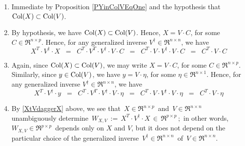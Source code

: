 \begin{theorem}
\begin{enumerate}
\end{enumerate}
\end{theorem}
\proof
\begin{enumerate}
\item
	Immediate by Proposition \ref{PYinColVEqOne} and the hypothesis that $\textnormal{Col}(X) \subset \textnormal{Col}(V)$.
\item
	By hypothesis, we have $\textnormal{Col}(X) \subset \textnormal{Col}(V)$.
	Hence, $X = V \cdot C$, for some $C \in \Re^{n \times p}$.
	Hence, for any generalized inverse $V^{\dagger} \in \Re^{n \times n}$,
	we have
	\begin{equation*}
	X^{T} \cdot V^{\dagger} \cdot X
	\;\; = \;\;
		C^{T} \cdot V^{T} \cdot V^{\dagger} \cdot V \cdot C
	\;\; = \;\;
		C^{T} \cdot V \cdot V^{\dagger} \cdot V \cdot C
	\;\; = \;\;
		C^{T} \cdot V \cdot C
	\end{equation*}
\item
	Again, since $\textnormal{Col}(X) \subset \textnormal{Col}(V)$, we may write
	$X = V \cdot C$, for some $C \in \Re^{n \times p}$.
	Similarly, since $y \in \textnormal{Col}(V)$, we have $y = V \cdot \eta$,
	for some $\eta \in \Re^{n \times 1}$.
	Hence, for any generalized inverse $V^{\dagger} \in \Re^{n \times n}$,
	we have
	\begin{equation*}
	X^{T} \cdot V^{\dagger} \cdot y
	\;\; = \;\;
		C^{T} \cdot V^{T} \cdot V^{\dagger} \cdot V \cdot \eta
	\;\; = \;\;
		C^{T} \cdot V \cdot V^{\dagger} \cdot V \cdot  \eta
	\;\; = \;\;
		C^{T} \cdot V \cdot \eta
	\end{equation*}
\item
	By \eqref{XtVdaggerX} above, we see that
	\,$X \in \Re^{n \times p}$\, and \,$V \in \Re^{n \times n}$\,
	unambiguously determine
	\,$W_{X,V} \, := \, X^{T} \cdot V^{\dagger} \cdot X \, \in \, \Re^{p \times p}$\,;\,
	in other words, \,$W_{X,V} \in \Re^{p \times p}$\, depends only on $X$ and $V$,
	but it does not depend on the particular choice of the generalized inverse
	\,$V^{\dagger} \in \Re^{n \times n}$\, of \,$V \in \Re^{n \times n}$.
	

\end{enumerate}
